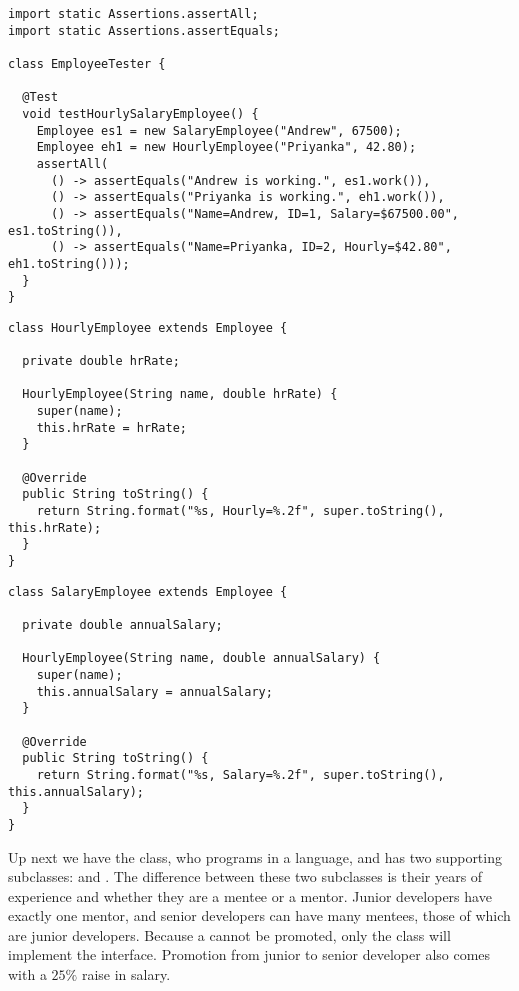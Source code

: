 \enlargethispage{-6\baselineskip}
\begin{lstlisting}[language=MyJava]
import static Assertions.assertAll;
import static Assertions.assertEquals;

class EmployeeTester {

  @Test
  void testHourlySalaryEmployee() {
    Employee es1 = new SalaryEmployee("Andrew", 67500);
    Employee eh1 = new HourlyEmployee("Priyanka", 42.80);
    assertAll(
      () -> assertEquals("Andrew is working.", es1.work()),
      () -> assertEquals("Priyanka is working.", eh1.work()),
      () -> assertEquals("Name=Andrew, ID=1, Salary=$67500.00", es1.toString()),
      () -> assertEquals("Name=Priyanka, ID=2, Hourly=$42.80", eh1.toString()));
  }
}
\end{lstlisting}

\begin{lstlisting}[language=MyJava]
class HourlyEmployee extends Employee {

  private double hrRate;

  HourlyEmployee(String name, double hrRate) {
    super(name);
    this.hrRate = hrRate;
  }

  @Override
  public String toString() {
    return String.format("%s, Hourly=%.2f", super.toString(), this.hrRate);
  }
}
\end{lstlisting}

\begin{lstlisting}[language=MyJava]
class SalaryEmployee extends Employee {

  private double annualSalary;

  HourlyEmployee(String name, double annualSalary) {
    super(name);
    this.annualSalary = annualSalary;
  }

  @Override
  public String toString() {
    return String.format("%s, Salary=%.2f", super.toString(), this.annualSalary);
  }
}
\end{lstlisting}

Up next we have the  class, who programs in a language, and has two supporting subclasses:  and . 
The difference between these two subclasses is their years of experience and whether they are a mentee or a mentor. 
Junior developers have exactly one mentor, and senior developers can have many mentees, those of which are junior developers. 
Because a  cannot be promoted, only the  class will implement the  interface. 
Promotion from junior to senior developer also comes with a $25\%$ raise in salary.

